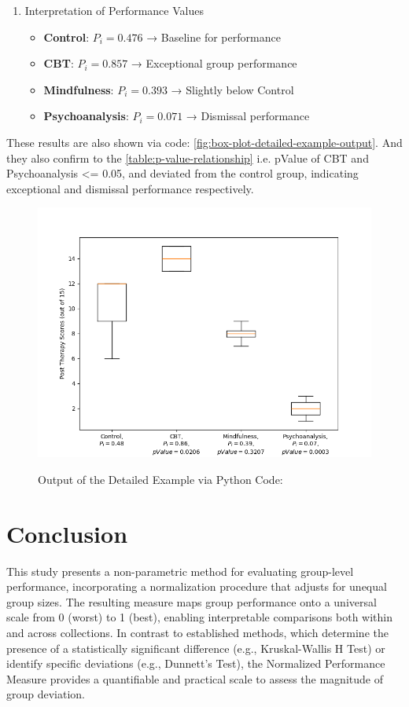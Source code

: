 \documentclass[a4paper,fleqn,review]{cas-sc}
\begin{document}
\begin{enumerate}[Step 1.]
	\item Interpretation of Performance Values
	\begin{itemize}
		\item \textbf{Control}: $P_i = 0.476$ → Baseline for performance
		\item \textbf{CBT}: $P_i = 0.857$ → Exceptional group performance
		\item \textbf{Mindfulness}: $P_i = 0.393$ → Slightly below Control
		\item \textbf{Psychoanalysis}: $P_i = 0.071$ → Dismissal performance
	\end{itemize}
\end{enumerate}
These results are also shown via code: \autoref{fig:box-plot-detailed-example-output}. And they also confirm to the \autoref{table:p-value-relationship} i.e. pValue of CBT and Psychoanalysis <= 0.05, and deviated from the control group, indicating exceptional and dismissal performance respectively.
\begin{figure}
	\caption{Output of the Detailed Example via Python Code:}
	\centering
	\includegraphics [scale=0.55]{output-detailed-example.png}
	\label{fig:box-plot-detailed-example-output}
\end{figure}
\section{Conclusion}
This study presents a non-parametric method for evaluating group-level performance, incorporating a normalization procedure that adjusts for unequal group sizes. The resulting measure maps group performance onto a universal scale from 0 (worst) to 1 (best), enabling interpretable comparisons both within and across collections. In contrast to established methods, which determine the presence of a statistically significant difference (e.g., Kruskal-Wallis H Test) or identify specific deviations (e.g., Dunnett's Test), the Normalized Performance Measure provides a quantifiable and practical scale to assess the magnitude of group deviation.

\pagebreak


\appendix
\end{document}
